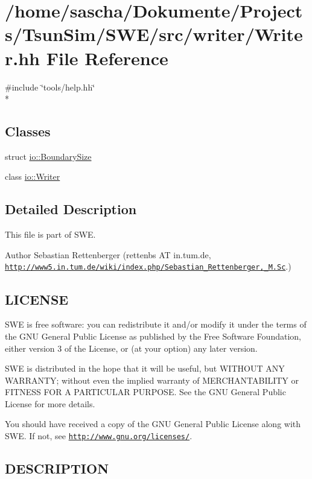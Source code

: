 \hypertarget{Writer_8hh}{\section{/home/sascha/\-Dokumente/\-Projects/\-Tsun\-Sim/\-S\-W\-E/src/writer/\-Writer.hh File Reference}
\label{Writer_8hh}
}
{\ttfamily \#include \char`\"{}tools/help.\-hh\char`\"{}}\\*
\subsection*{Classes}
\begin{DoxyCompactItemize}
\item 
struct \hyperlink{structio_1_1BoundarySize}{io\-::\-Boundary\-Size}
\item 
class \hyperlink{classio_1_1Writer}{io\-::\-Writer}
\end{DoxyCompactItemize}


\subsection{Detailed Description}
This file is part of S\-W\-E.

\begin{DoxyAuthor}{Author}
Sebastian Rettenberger (rettenbs A\-T in.\-tum.\-de, \href{http://www5.in.tum.de/wiki/index.php/Sebastian_Rettenberger,_M.Sc}{\tt http\-://www5.\-in.\-tum.\-de/wiki/index.\-php/\-Sebastian\-\_\-\-Rettenberger,\-\_\-\-M.\-Sc}.)
\end{DoxyAuthor}
\hypertarget{Writer_8hh_LICENSE}{}\subsection{L\-I\-C\-E\-N\-S\-E}\label{Writer_8hh_LICENSE}
S\-W\-E is free software\-: you can redistribute it and/or modify it under the terms of the G\-N\-U General Public License as published by the Free Software Foundation, either version 3 of the License, or (at your option) any later version.

S\-W\-E is distributed in the hope that it will be useful, but W\-I\-T\-H\-O\-U\-T A\-N\-Y W\-A\-R\-R\-A\-N\-T\-Y; without even the implied warranty of M\-E\-R\-C\-H\-A\-N\-T\-A\-B\-I\-L\-I\-T\-Y or F\-I\-T\-N\-E\-S\-S F\-O\-R A P\-A\-R\-T\-I\-C\-U\-L\-A\-R P\-U\-R\-P\-O\-S\-E. See the G\-N\-U General Public License for more details.

You should have received a copy of the G\-N\-U General Public License along with S\-W\-E. If not, see \href{http://www.gnu.org/licenses/}{\tt http\-://www.\-gnu.\-org/licenses/}.\hypertarget{NetCdfWriter_8hh_DESCRIPTION}{}\subsection{D\-E\-S\-C\-R\-I\-P\-T\-I\-O\-N}\label{NetCdfWriter_8hh_DESCRIPTION}
